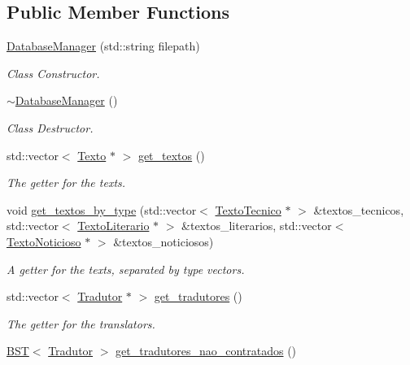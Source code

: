 \subsection*{Public Member Functions}
\begin{DoxyCompactItemize}
\item 
\hyperlink{class_database_manager_a24e3c3701ce01fdac96cc170b334aeba}{Database\-Manager} (std\-::string filepath)
\begin{DoxyCompactList}\small\item\em Class Constructor. \end{DoxyCompactList}\item 
\hyperlink{class_database_manager_ae9b3a5da1e04fbb00faf8a034da1d063}{$\sim$\-Database\-Manager} ()
\begin{DoxyCompactList}\small\item\em Class Destructor. \end{DoxyCompactList}\item 
std\-::vector$<$ \hyperlink{class_texto}{Texto} $\ast$ $>$ \hyperlink{class_database_manager_a362dc9fb3beb6cd0ca9cb1d42703ec03}{get\-\_\-textos} ()
\begin{DoxyCompactList}\small\item\em The getter for the texts. \end{DoxyCompactList}\item 
void \hyperlink{class_database_manager_a3ea3390feb2069715c7af51ebb41a26c}{get\-\_\-textos\-\_\-by\-\_\-type} (std\-::vector$<$ \hyperlink{class_texto_tecnico}{Texto\-Tecnico} $\ast$ $>$ \&textos\-\_\-tecnicos, std\-::vector$<$ \hyperlink{class_texto_literario}{Texto\-Literario} $\ast$ $>$ \&textos\-\_\-literarios, std\-::vector$<$ \hyperlink{class_texto_noticioso}{Texto\-Noticioso} $\ast$ $>$ \&textos\-\_\-noticiosos)
\begin{DoxyCompactList}\small\item\em A getter for the texts, separated by type vectors. \end{DoxyCompactList}\item 
std\-::vector$<$ \hyperlink{class_tradutor}{Tradutor} $\ast$ $>$ \hyperlink{class_database_manager_ad0f509067821ad15a9b25d86d2b515a4}{get\-\_\-tradutores} ()
\begin{DoxyCompactList}\small\item\em The getter for the translators. \end{DoxyCompactList}\item 
\hyperlink{class_b_s_t}{B\-S\-T}$<$ \hyperlink{class_tradutor}{Tradutor} $>$ \hyperlink{class_database_manager_a86e4c763689ebc8e3c7b6ed3f01728aa}{get\-\_\-tradutores\-\_\-nao\-\_\-contratados} ()

\end{DoxyCompactItemize}
